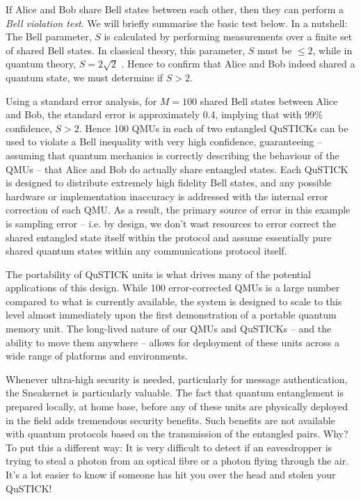 \documentclass[twocolumn, aps, rmp, amsmath, amssymb, nofootinbib, superscriptaddress, longbibliography, floatfix, table-of-contents, eqsecnum]{revtex4-2}
\begin{document}
If Alice and Bob share Bell states between each other, then they can perform a \textit{Bell violation test}. We will briefly summarise the basic test below. In a nutshell: The Bell parameter, $S$ is calculated by performing measurements over a finite set of shared Bell states. In classical theory, this parameter, $S$ must be $\leq 2$, while in quantum theory, $S=2\sqrt{2}$ \cite{SD-Clauser:1969aa}. Hence to confirm that Alice and Bob indeed shared a quantum state, we must determine if $S>2$.

Using a standard error analysis, for $M = 100$ shared Bell states between Alice and Bob, the standard error is approximately 0.4, implying that with 99\% confidence, $S > 2$. Hence 100 QMUs in each of two entangled QuSTICKs can be used to violate a Bell inequality with very high confidence, guaranteeing -- assuming that quantum mechanics is correctly describing the behaviour of the QMUs -- that Alice and Bob do actually share entangled states. Each QuSTICK is designed to distribute extremely high fidelity Bell states, and any possible hardware or implementation inaccuracy is addressed with the internal error correction of each QMU. As a result, the primary source of error in this example is sampling error -- i.e. by design, we don't wast resources to error correct the shared entangled state itself within the protocol and assume essentially pure shared quantum states within any communications protocol itself.

The portability of QuSTICK units is what drives many of the potential applications of this design. While 100 error-corrected QMUs is a large number compared to what is currently available, the system is designed to scale to this level almost immediately upon the first demonstration of a portable quantum memory unit. The long-lived nature of our QMUs and QuSTICKs -- and the ability to move them anywhere -- allows for deployment of these units across a wide range of platforms and environments. 

Whenever ultra-high security is needed, particularly for message authentication, the Sneakernet is particularly valuable. The fact that quantum entanglement is prepared locally, at home base, before any of these units are physically deployed in the field adds tremendous security benefits. Such benefits are not available with quantum protocols based on the transmission of the entangled pairs. Why? To put this a different way: It is very difficult to detect if an eavesdropper is trying to steal a photon from an optical fibre or a photon flying through the air. It's a lot easier to know if someone has hit you over the head and stolen your QuSTICK!
\end{document}
